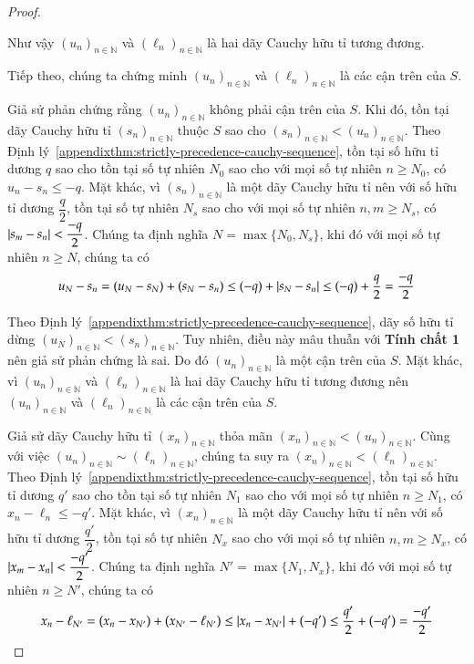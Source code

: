 \begin{proof}
\begin{enumerate}[label={\textbf{Tính chất \arabic*.}},itemindent=1.7cm]
              Như vậy ${(u_{n})}_{n\in\mathbb{N}}$ và ${(\ell_{n})}_{n\in\mathbb{N}}$ là hai dãy Cauchy hữu tỉ tương đương.
    \end{enumerate}

    Tiếp theo, chúng ta chứng minh ${(u_{n})}_{n\in\mathbb{N}}$ và ${(\ell_{n})}_{n\in\mathbb{N}}$ là các cận trên của $S$.

    Giả sử phản chứng rằng ${(u_{n})}_{n\in\mathbb{N}}$ không phải cận trên của $S$. Khi đó, tồn tại dãy Cauchy hữu tỉ ${(s_{n})}_{n\in\mathbb{N}}$ thuộc $S$ sao cho ${(s_{n})}_{n\in\mathbb{N}} < {(u_{n})}_{n\in\mathbb{N}}$. Theo Định lý~\ref{appendixthm:strictly-precedence-cauchy-sequence}, tồn tại số hữu tỉ dương $q$ sao cho tồn tại số tự nhiên $N_{0}$ sao cho với mọi số tự nhiên $n\geq N_{0}$, có $u_{n} - s_{n}\leq -q$. Mặt khác, vì ${(s_{n})}_{n\in\mathbb{N}}$ là một dãy Cauchy hữu tỉ nên với số hữu tỉ dương $\dfrac{q}{2}$, tồn tại số tự nhiên $N_{s}$ sao cho với mọi số tự nhiên $n, m\geq N_{s}$, có $\left\vert{s_{m} - s_{n}}\right\vert < \dfrac{-q}{2}$. Chúng ta định nghĩa $N = \max\{ N_{0}, N_{s} \}$, khi đó với mọi số tự nhiên $n\geq N$, chúng ta có
    \[
        u_{N} - s_{n} = (u_{N} - s_{N}) + (s_{N} - s_{n}) \leq (-q) + \left\vert{s_{N} - s_{n}}\right\vert \leq (-q) + \frac{q}{2} = \frac{-q}{2}
    \]

    Theo Định lý~\ref{appendixthm:strictly-precedence-cauchy-sequence}, dãy số hữu tỉ dừng ${(u_{N})}_{n\in\mathbb{N}} < {(s_{n})}_{n\in\mathbb{N}}$. Tuy nhiên, điều này mâu thuẫn với \textbf{Tính chất 1} nên giả sử phản chứng là sai. Do đó ${(u_{n})}_{n\in\mathbb{N}}$ là một cận trên của $S$. Mặt khác, vì ${(u_{n})}_{n\in\mathbb{N}}$ và ${(\ell_{n})}_{n\in\mathbb{N}}$ là hai dãy Cauchy hữu tỉ tương đương nên ${(u_{n})}_{n\in\mathbb{N}}$ và ${(\ell_{n})}_{n\in\mathbb{N}}$ là các cận trên của $S$.

    Giả sử dãy Cauchy hữu tỉ ${(x_{n})}_{n\in\mathbb{N}}$ thỏa mãn ${(x_{n})}_{n\in\mathbb{N}} < {(u_{n})}_{n\in\mathbb{N}}$. Cùng với việc ${(u_{n})}_{n\in\mathbb{N}}\sim {(\ell_{n})}_{n\in\mathbb{N}}$, chúng ta suy ra ${(x_{n})}_{n\in\mathbb{N}} < {(\ell_{n})}_{n\in\mathbb{N}}$. Theo Định lý~\ref{appendixthm:strictly-precedence-cauchy-sequence}, tồn tại số hữu tỉ dương $q'$ sao cho tồn tại số tự nhiên $N_{1}$ sao cho với mọi số tự nhiên $n\geq N_{1}$, có $x_{n} - \ell_{n}\leq -q'$. Mặt khác, vì ${(x_{n})}_{n\in\mathbb{N}}$ là một dãy Cauchy hữu tỉ nên với số hữu tỉ dương $\dfrac{q'}{2}$, tồn tại số tự nhiên $N_{x}$ sao cho với mọi số tự nhiên $n, m\geq N_{x}$, có $\left\vert{x_{m} - x_{n}}\right\vert < \dfrac{-q'}{2}$. Chúng ta định nghĩa $N' = \max\{ N_{1}, N_{x} \}$, khi đó với mọi số tự nhiên $n\geq N'$, chúng ta có
    \[
        x_{n} - \ell_{N'} = (x_{n} - x_{N'}) + (x_{N'} - \ell_{N'})\leq \left\vert{x_{n} - x_{N'}}\right\vert + (-q')\leq \frac{q'}{2} + (-q') = \frac{-q'}{2}
    \]


\end{proof}
